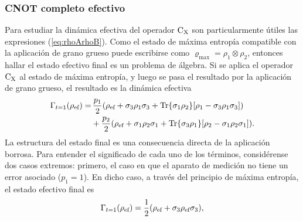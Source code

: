 \subsubsection{CNOT completo efectivo}

Para estudiar la dinámica efectiva del operador $\text{C}_{\text{X}}$ son particularmente útiles las expresiones (\ref{eq:rhoArhoB}). Como el estado de máxima entropía compatible con la aplicación de grano grueso puede escribirse como $\varrho_{\max}=\rho_{1}\otimes\rho_{2}$, entonces hallar el estado efectivo final es un problema de álgebra. Si se aplica el operador $\text{C}_{\text{X}}$ al estado de máxima entropía, y luego se pasa el resultado por la aplicación de grano grueso, el resultado es la dinámica efectiva
\begin{align}
    \Gamma_{t=1}(\rho_{\text{ef}})=&\,\frac{p_{1}}{2}(\rho_{\text{ef}}+\sigma_{3}\rho_{1}\sigma_{3}+\Tr{\sigma_{1}\rho_{2}}[\rho_{1}-\sigma_{3}\rho_{1}\sigma_{3}])\nonumber\\
    &+\frac{p_{2}}{2}(\rho_{\text{ef}}+\sigma_{1}\rho_{2}\sigma_{1}+\Tr{\sigma_{3}\rho_{1}}[\rho_{2}-\sigma_{1}\rho_{2}\sigma_{1}]).\nonumber
\end{align}
La estructura del estado final es una consecuencia directa de la aplicación borrosa. Para entender el significado de cada uno de los términos, considérense dos casos extremos: primero, el caso en que el aparato de medición no tiene un error asociado ($p_{1}=1$). En dicho caso, a través del principio de máxima entropía, el estado efectivo final es
\begin{equation}
  \Gamma_{t=1}(\rho_{\text{ef}})=\frac{1}{2}\qty(\rho_{\text{ef}}+\sigma_{3}\rho_{\text{ef}}\sigma_{3}),\nonumber
\end{equation}
